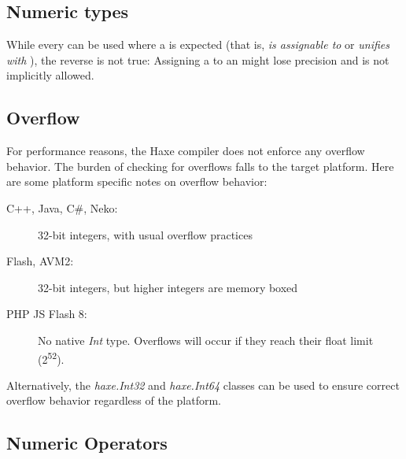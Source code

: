 \documentclass{haxe}
\begin{document}
\subsection{Numeric types}
\label{types-numeric-types}

While every  can be used where a  is expected (that is,  \emph{is assignable to} or \emph{unifies with} ), the reverse is not true: Assigning a  to an  might lose precision and is not implicitly allowed.

\subsection{Overflow}
\label{types-overflow}

For performance reasons, the Haxe compiler does not enforce any overflow behavior.  The burden of checking for overflows falls to the target platform. Here are some platform specific notes on overflow behavior:

\begin{description}
 \item[C++, Java, C\#, Neko:] 32-bit integers, with usual overflow practices 
 \item[Flash, AVM2:] 32-bit integers, but higher integers are memory boxed
 \item[PHP JS Flash 8:] No native \emph{Int} type.  Overflows will occur if they reach their float limit (2\textsuperscript{52}).
\end{description}

Alternatively, the \emph{haxe.Int32} and \emph{haxe.Int64} classes can be used to ensure correct overflow behavior regardless of the platform.  

\subsection{Numeric Operators}
\label{types-numeric-operators}
\end{document}
